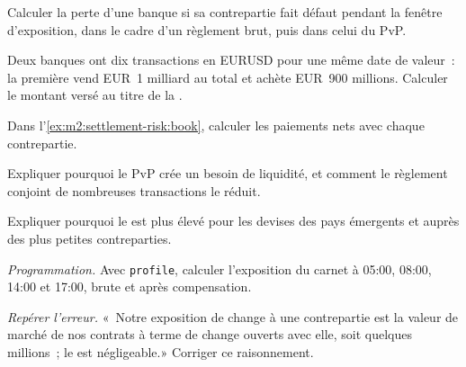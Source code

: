 \begin{exercise}[$\star$]\label{exo:m2:settlement-risk:2}
Calculer la perte d'une banque si sa contrepartie fait défaut pendant la fenêtre
d'exposition, dans le cadre d'un règlement brut, puis dans celui du PvP.
\end{exercise}

\begin{exercise}[$\star$]\label{exo:m2:settlement-risk:3}
Deux banques ont dix transactions en EURUSD pour une même date de valeur~: la première vend
EUR~1 milliard au total et achète EUR~900 millions. Calculer le montant versé au titre de la .
\end{exercise}

\begin{exercise}[$\star\star$]\label{exo:m2:settlement-risk:4}
Dans l'\cref{ex:m2:settlement-risk:book}, calculer les paiements nets avec chaque contrepartie.
\end{exercise}

\begin{exercise}[$\star\star$]\label{exo:m2:settlement-risk:5}
Expliquer pourquoi le PvP crée un besoin de liquidité, et comment le règlement conjoint
de nombreuses transactions le réduit.
\end{exercise}

\begin{exercise}[$\star\star$]\label{exo:m2:settlement-risk:6}
Expliquer pourquoi le  est plus élevé pour les devises des pays émergents
et auprès des plus petites contreparties.
\end{exercise}

\begin{exercise}[$\star\star\star$]\label{exo:m2:settlement-risk:7}
\emph{Programmation.} Avec \texttt{profile}, calculer l'exposition du carnet à 05:00,
08:00, 14:00 et 17:00, brute et après compensation.
\end{exercise}

\begin{exercise}[$\star\star\star$]\label{exo:m2:settlement-risk:8}
\emph{Repérer l'erreur.} «~Notre exposition de change à une contrepartie est la valeur de marché de nos
contrats à terme de change ouverts avec elle, soit quelques millions~; le  est négligeable.» Corriger ce raisonnement.
\end{exercise}

